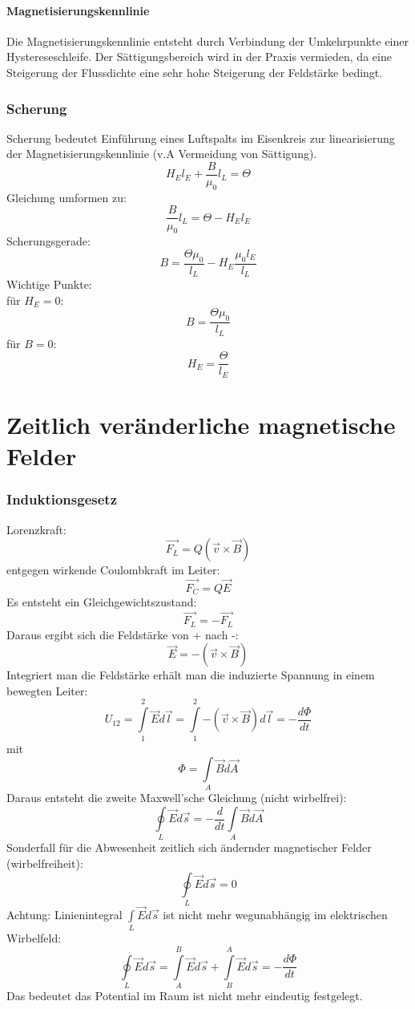 \documentclass[12pt,a4paper]{article}
\begin{document}
\subsection{Magnetisierungskennlinie}
Die Magnetisierungskennlinie entsteht durch Verbindung der Umkehrpunkte einer Hystereseschleife. Der Sättigungsbereich wird in der Praxis vermieden, da eine Steigerung der Flussdichte eine sehr hohe Steigerung der Feldstärke bedingt.

\section{Scherung}
Scherung bedeutet Einführung eines Luftspalts im Eisenkreis zur linearisierung der Magnetisierungskennlinie (v.A Vermeidung von Sättigung).
\[H_E l_E + \frac{B}{\mu_0} l_L = \Theta\]
Gleichung umformen zu:
\[\frac{B}{\mu_0} l_L = \Theta - H_E l_E\]
Scherungsgerade:
\[B = \frac{\Theta \mu_0}{l_L} - H_E \frac{\mu_0 l_E}{l_L}\]
Wichtige Punkte:\\
für $H_E = 0$:
\[B = \frac{\Theta \mu_0}{l_L}\]
für $B = 0$:
\[H_E = \frac{\Theta}{l_E}\]

\part{Zeitlich veränderliche magnetische Felder}
\section{Induktionsgesetz}
Lorenzkraft:
\[\vec{F_L} =  Q (\vec{v} \times \vec{B})\]
entgegen wirkende Coulombkraft im Leiter:
\[\vec{F_C} = Q \vec{E}\]
Es entsteht ein Gleichgewichtszustand:
\[\vec{F_L} = - \vec{F_L}\]
Daraus ergibt sich die Feldstärke von + nach -:
\[\vec{E} = -(\vec{v} \times \vec{B})\]
Integriert man die Feldstärke erhält man die induzierte Spannung in einem bewegten Leiter:
\[U_{12} = \int\limits_1^2{\vec{E} d\vec{l}} = \int\limits_1^2{-(\vec{v} \times \vec{B}) d\vec{l}} = -\frac{d\Phi}{dt}\]
mit
\[\Phi = \int\limits_A{\vec{B} d\vec{A}}\]
Daraus entsteht die zweite Maxwell'sche Gleichung (nicht wirbelfrei):
\[\oint\limits_L{\vec{E} d\vec{s}} = -\frac{d}{dt} \int\limits_A{\vec{B} d\vec{A}}\]
Sonderfall für die Abwesenheit zeitlich sich ändernder magnetischer Felder (wirbelfreiheit):
\[\oint\limits_L{\vec{E} d\vec{s}} = 0\]
Achtung: Linienintegral $\int\limits_L{\vec{E} d\vec{s}}$ ist nicht mehr wegunabhängig im elektrischen Wirbelfeld:
\[\oint\limits_L{\vec{E}d\vec{s}} = \int\limits_A^B{\vec{E} d \vec{s}} + \int\limits_B^A{\vec{E} d\vec{s}} = - \frac{d \Phi}{dt}\]
Das bedeutet das Potential im Raum ist nicht mehr eindeutig festgelegt.
\end{document}
